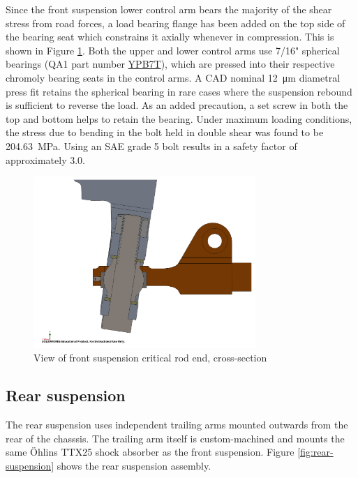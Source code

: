 \documentclass[10pt]{article}
\begin{document}
Since the front suspension lower control arm bears the majority of the shear stress from road forces, a load bearing flange has been added on the top side of the bearing seat which constrains it axially whenever in compression. This is shown in Figure \ref{fig:front-suspension-cross-section}. Both the upper and lower control arms use 7/16" spherical bearings (QA1 part number \href{https://www.qa1.net/rod-ends-and-related/spherical-bearings/ypb-t-high-misalignment-stainless-steel-series}{YPB7T}), which are pressed into their respective chromoly bearing seats in the control arms. A CAD nominal \SI{12}{\micro\metre} diametral press fit retains the spherical bearing in rare cases where the suspension rebound is sufficient to reverse the load. As an added precaution, a set screw in both the top and bottom helps to retain the bearing. Under maximum loading conditions, the stress due to bending in the bolt held in double shear was found to be \SI{204.63}{\mega\pascal}. Using an SAE grade 5 bolt results in a safety factor of approximately 3.0.

\begin{figure}
\centering
\includegraphics[width=0.75\textwidth]{figures/front-suspension-cross-section}
\caption{View of front suspension critical rod end, cross-section}
\label{fig:front-suspension-cross-section}
\end{figure}

\subsection{Rear suspension}
The rear suspension uses independent trailing arms mounted outwards from the rear of the chasssis. The trailing arm itself is custom-machined and mounts the same \"Ohlins TTX25 shock absorber as the front suspension. Figure \ref{fig:rear-suspension} shows the rear suspension assembly.
\end{document}

